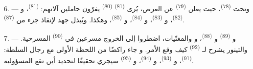 6. --- وتحت  \textsuperscript{(78)}، حيث يعلن 
\textsuperscript{(79)} عن العرض، يُرى  \textsuperscript{(81)}
 \textsuperscript{(80)} يفرّون حاملين آلاتهم:
 \textsuperscript{(81)}، و \textsuperscript{(82)}،
و \textsuperscript{(83)}، و \textsuperscript{(84)}،
و \textsuperscript{(85)}، وهكذا. ويُبذل جهد لإنقاذ جزء من
 \textsuperscript{(87)}.

7. --- و \textsuperscript{(89)} و
\textsuperscript{(88)}، و والمغنّيات، اضطروا إلى الخروج
مسرعين في  \textsuperscript{(90)} المسرحية. والتينور يشرح
لـ \textsuperscript{(92)} كيف وقع الأمر. و جاء
راكضًا من اللحظة الأولى مع رجال السلطة:  \textsuperscript{(91)}،
و \textsuperscript{(93)}، و \textsuperscript{(94)}،
و \textsuperscript{(95)} سيجري تحقيقًا لتحديد أين تقع المسؤولية.
\VUsaut{6.0mm}
\VUfilet{22mm}
